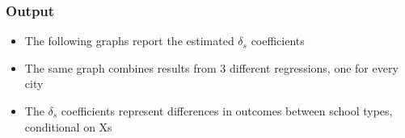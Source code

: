 \documentclass{beamer}
\begin{document}
\begin{frame}\frametitle{Output}
\begin{itemize}
	\item The following graphs report the estimated $\delta_{s}$ coefficients 
	\item The same graph combines results from 3 different regressions, one for every city
	\vspace{2ex}
	\item The $\delta_{s}$ coefficients represent differences in outcomes between school types, conditional on Xs
\end{itemize}
\end{frame}

\end{document}
